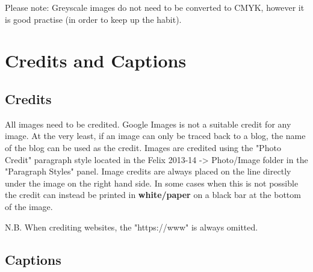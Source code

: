 Please note: Greyscale images do not need to be converted to CMYK, however it is good practise (in order to keep up the habit).

\section{Credits and Captions}


\subsection{Credits}

All images need to be credited. Google Images is not a suitable credit for any image. At the very least, if an image can only be traced back to a blog, the name of the blog can be used as the credit.
Images are credited using the "Photo Credit" paragraph style located in the Felix 2013-14 -> Photo/Image folder in the "Paragraph Styles" panel. Image credits are always placed on the line directly under the image on the right hand side. In some cases when this is not possible the credit can instead be printed in \textbf{white/paper} on a black bar at the bottom of the image.

N.B. When crediting websites, the "https://www" is always omitted. 

\subsection{Captions}
